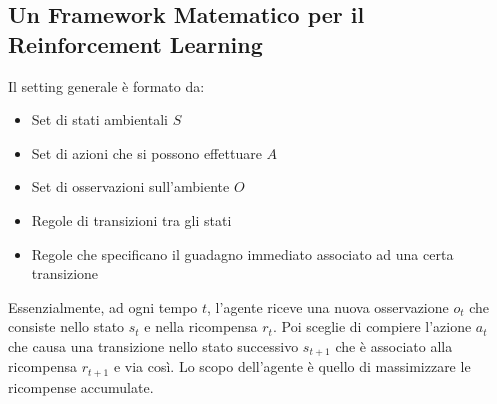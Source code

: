 \subsection{Un Framework Matematico per il Reinforcement Learning}
Il setting generale è formato da:
\begin{itemize}
    \item Set di stati ambientali \(S\)
    \item Set di azioni che si possono effettuare \(A\)
    \item Set di osservazioni sull'ambiente \(O\)
    \item Regole di transizioni tra gli stati
    \item Regole che specificano il guadagno immediato associato ad una certa transizione
\end{itemize}

Essenzialmente, ad ogni tempo \(t\), l'agente riceve una nuova osservazione \(o_t\) che consiste nello stato \(s_t\) e nella ricompensa \(r_t\). Poi sceglie di compiere l'azione \(a_t\) che causa una transizione nello stato successivo \(s_{t+1}\) che è associato alla ricompensa \(r_{t+1}\) e via così. Lo scopo dell'agente è quello di massimizzare le ricompense accumulate.\\

